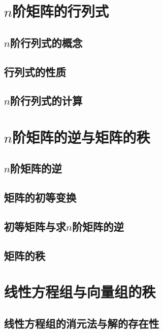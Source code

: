 \documentclass[lang=cn,10pt]{elegantbook}
\begin{document}
\chapter{\( n \)阶矩阵的行列式}

	\section{\( n \)阶行列式的概念}
	
	\section{行列式的性质}
	
	\section{\( n \)阶行列式的计算}
	
\chapter{\( n \)阶矩阵的逆与矩阵的秩}

	\section{\( n \)阶矩阵的逆}
	
	\section{矩阵的初等变换}
	
	\section{初等矩阵与求\( n \)阶矩阵的逆}
	
	\section{矩阵的秩}
	
\chapter{线性方程组与向量组的秩}

	\section{线性方程组的消元法与解的存在性}
\end{document}
